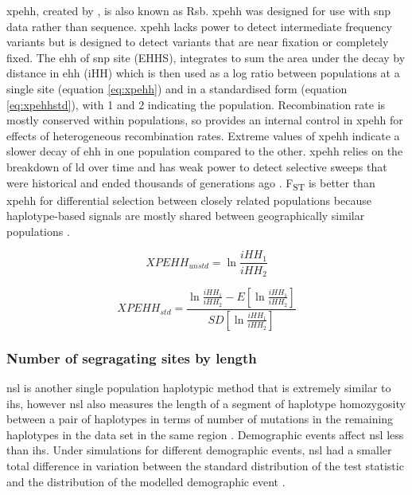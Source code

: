 \documentclass[twoside,openright]{report}
\begin{document}
\Gls{xpehh}, created by \citet{tang2007new}, is also known as Rsb.
\Gls{xpehh} was designed for use with \gls{snp} data rather than
sequence. \Gls{xpehh} lacks power to detect intermediate frequency
variants but is designed to detect variants that are near fixation or
completely fixed. The \gls{ehh} of \gls{snp} site (EHHS), integrates to
sum the area under the decay by distance in \gls{ehh} (iHH) which is
then used as a log ratio between populations at a single site (equation
\eqref{eq:xpehh}) and in a standardised form (equation \eqref{eq:xpehhstd}),
with 1 and 2 indicating the population. Recombination rate is mostly
conserved within populations, so provides an internal control in
\gls{xpehh} for effects of heterogeneous recombination rates. Extreme
values of \gls{xpehh} indicate a slower decay of \gls{ehh} in one
population compared to the other. \Gls{xpehh} relies on the breakdown of
\gls{ld} over time and has weak power to detect selective sweeps that
were historical and ended thousands of generations ago \citep{Chen2010}.
F\textsubscript{ST} is better than \gls{xpehh} for differential
selection between closely related populations because haplotype-based
signals are mostly shared between geographically similar populations
\citep{pickrell2009signals}.

\begin{equation} 
 XPEHH_{unstd} = \ln{\frac{iHH_1}{iHH_2}}
\label{eq:xpehh}
\end{equation}

\begin{equation} 
 XPEHH_{std} = \frac{\ln{\frac{iHH_1}{iHH_2}} - E [ \ln{\frac{iHH_1}{iHH_2}} ]}{ SD [ \ln{\frac{iHH_1}{iHH_2}} ]}
\label{eq:xpehhstd}
\end{equation}

\subsubsection{Number of segragating sites by
length}\label{number-of-segragating-sites-by-length}

\Glsdesc{nsl} is another single population haplotypic method that is
extremely similar to \gls{ihs}, however \gls{nsl} also measures the
length of a segment of haplotype homozygosity between a pair of
haplotypes in terms of number of mutations in the remaining haplotypes
in the data set in the same region \citep{Ferrer-Admetlla2014}.
Demographic events affect \gls{nsl} less than \gls{ihs}. Under
simulations for different demographic events, \gls{nsl} had a smaller
total difference in variation between the standard distribution of the
test statistic and the distribution of the modelled demographic event
\citep{Ferrer-Admetlla2014}.
\end{document}
